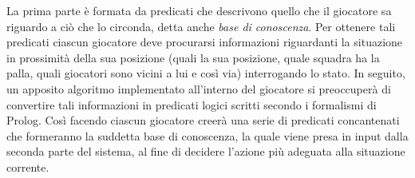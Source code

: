 La prima parte \`{e} formata da predicati che descrivono quello che il giocatore sa riguardo a ci\`{o} che lo circonda, detta anche \emph{base di conoscenza}. Per ottenere tali predicati ciascun giocatore deve procurarsi informazioni riguardanti la situazione in prossimit\`{a} della sua posizione (quali la sua posizione, quale squadra ha la palla, quali giocatori sono vicini a lui e cos\`{i} via) interrogando lo stato.  In seguito, un apposito algoritmo implementato all'interno del giocatore si preoccuper\`{a} di convertire tali informazioni in predicati logici scritti secondo i formalismi di Prolog. Cos\`{i} facendo ciascun giocatore creer\`{a} una serie di predicati concantenati che formeranno la suddetta base di conoscenza, la quale viene presa in input dalla seconda parte del sistema, al fine di decidere l'azione pi\`{u} adeguata alla situazione corrente.

